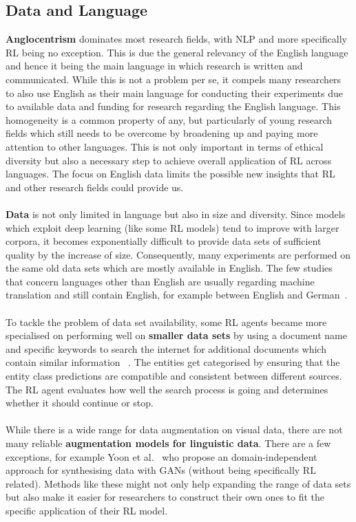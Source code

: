 \documentclass[11pt]{article}
\begin{document}
\subsection{Data and Language}\label{data}
\textbf{Anglocentrism} dominates most research fields, with NLP and more specifically RL being no exception. This is due the general relevancy of the English language and hence it being the main language in which research is written and communicated. While this is not a problem per se, it compels many researchers to also use English as their main language for conducting their experiments due to available data and funding for research regarding the English language. This homogeneity is a common property of any, but particularly of young research fields which still needs to be overcome by broadening up and paying more attention to other languages. This is not only important in terms of ethical diversity but also a necessary step to achieve overall application of RL across languages. The focus on English data limits the possible new insights that RL and other research fields could provide us.\\\\
\textbf{Data} is not only limited in language but also in size and diversity. Since models which exploit deep learning (like some RL models) tend to improve with larger corpora, it becomes exponentially difficult to provide data sets of sufficient quality by the increase of size. Consequently, many experiments are performed on the same old data sets which are mostly available in English. The few studies that concern languages other than English are usually regarding machine translation and still contain English, for example between English and German~\cite{yasui-etal-2019}. \\\\
To tackle the problem of data set availability, some RL agents became more specialised on performing well on \textbf{smaller data sets} by using a document name and specific keywords to search the internet for additional documents which contain similar information ~\cite{narasimhan-etal-2016-improving}. The entities get categorised by ensuring that the entity class predictions are compatible and consistent between different sources. The RL agent evaluates how well the search process is going and determines whether it should continue or stop.\\\\
While there is a wide range for data augmentation on visual data, there are not many reliable \textbf{augmentation models for linguistic data}. There are a few exceptions, for example Yoon et al.~ who propose an domain-independent approach for synthesising data with GANs (without being specifically RL related). Methods like these might not only help expanding the range of data sets but also make it easier for researchers to construct their own ones to fit the specific application of their RL model.\\\\
\end{document}
